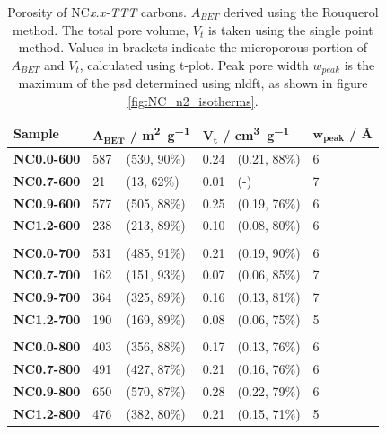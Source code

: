 \begin{table}[ht!]
    \caption{Porosity of NC\textit{x.x-TTT} carbons. $A_{BET}$ derived using the Rouquerol method. The total pore volume, $V_t$ is taken using the single point method. Values in brackets indicate the microporous portion of $A_{BET}$ and $V_t$, calculated using t-plot. Peak pore width $w_{peak}$ is the maximum of the \acrshort{psd} determined using \acrshort{nldft}, as shown in figure \ref{fig:NC_n2_isotherms}.}
    \label{tb:nc_porosity}
    \begin{tabularx}{\textwidth}{Xllllll}
    \toprule
        \textbf{Sample} & \multicolumn{2}{l}{$\mathbf{A_{BET}}$ \textbf{/ \unit[detect-weight]{\metre\squared\per\gram}}}  & \multicolumn{2}{l}{$\mathbf{V_t}$ \textbf{/ \unit[detect-weight]{\cm\cubed\per\gram}}} & \multicolumn{2}{l}{$\mathbf{w_{peak}}$ \textbf{/ \unit{\angstrom}}} \\
    \midrule
        \textbf{NC0.0-600} & 587 & (530, 90\%) & 0.24 & (0.21, 88\%) & 6 \\
        \textbf{NC0.7-600} & 21 & (13, 62\%) & 0.01 & (-) & 7 \\
        \textbf{NC0.9-600} & 577 & (505, 88\%) & 0.25 & (0.19, 76\%) & 6 \\
        \textbf{NC1.2-600} & 238 & (213, 89\%) & 0.10 & (0.08, 80\%) & 6 \\
        \\
        \textbf{NC0.0-700} & 531 & (485, 91\%) & 0.21 & (0.19, 90\%) & 6 \\
        \textbf{NC0.7-700} & 162 & (151, 93\%) & 0.07 & (0.06, 85\%) & 7 \\
        \textbf{NC0.9-700} & 364 & (325, 89\%) & 0.16 & (0.13, 81\%) & 7 \\
        \textbf{NC1.2-700} & 190 & (169, 89\%) & 0.08 & (0.06, 75\%) & 5 \\
        \\
        \textbf{NC0.0-800} & 403 & (356, 88\%) & 0.17 & (0.13, 76\%) & 6 \\
        \textbf{NC0.7-800} & 491 & (427, 87\%) & 0.21 & (0.16, 76\%) & 6 \\
        \textbf{NC0.9-800} & 650 & (570, 87\%) & 0.28 & (0.22, 79\%) & 6 \\
        \textbf{NC1.2-800} & 476 & (382, 80\%) & 0.21 & (0.15, 71\%) & 5 \\
    \bottomrule
    \end{tabularx}
\end{table}

